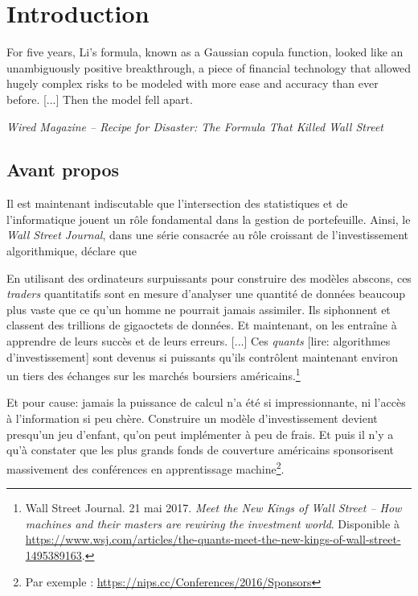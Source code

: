 \section{Introduction}
\label{sec:intro}

\epigraph{For five years, Li's formula, known as a Gaussian copula function, looked like
  an unambiguously positive breakthrough, a piece of financial technology that allowed
  hugely complex risks to be modeled with more ease and accuracy than ever before. [...]
  Then the model fell apart.}{\textit{Wired Magazine -- Recipe for Disaster: The Formula
    That Killed Wall Street}}


\subsection{Avant propos}

Il est maintenant indiscutable que l'intersection des statistiques et de l'informatique
jouent un rôle fondamental dans la gestion de portefeuille. Ainsi, le \textsl{Wall Street
  Journal}, dans une série consacrée au rôle croissant de l'investissement algorithmique,
déclare que
\begin{displayquote}
  En utilisant des ordinateurs surpuissants pour construire des modèles abscons, ces
  \textit{traders} quantitatifs sont en mesure d'analyser une quantité de données beaucoup
  plus vaste que ce qu'un homme ne pourrait jamais assimiler. Ils siphonnent et classent
  des trillions de gigaoctets de données. Et maintenant, on les entraîne à apprendre de
  leurs succès et de leurs erreurs. [...] Ces \textit{quants} [lire: algorithmes
  d'investissement] sont devenus si puissants qu'ils contrôlent maintenant environ un
  tiers des échanges sur les marchés boursiers américains.\footnote{Wall Street
    Journal. 21 mai 2017. \textit{Meet the New Kings of Wall Street -- How machines and
      their masters are rewiring the investment world}. Disponible à {\scriptsize
      \url{https://www.wsj.com/articles/the-quants-meet-the-new-kings-of-wall-street-1495389163}}.}
\end{displayquote}
Et pour cause: jamais la puissance de calcul n'a été si impressionnante, ni l'accès à
l'information si peu chère. Construire un modèle d'investissement devient presqu'un jeu
d'enfant, qu'on peut implémenter à peu de frais. Et puis il n'y a qu'à constater que les
plus grands fonds de couverture américains sponsorisent massivement des conférences en
apprentissage machine\footnote{Par exemple : {\scriptsize
    \url{https://nips.cc/Conferences/2016/Sponsors}}}.

